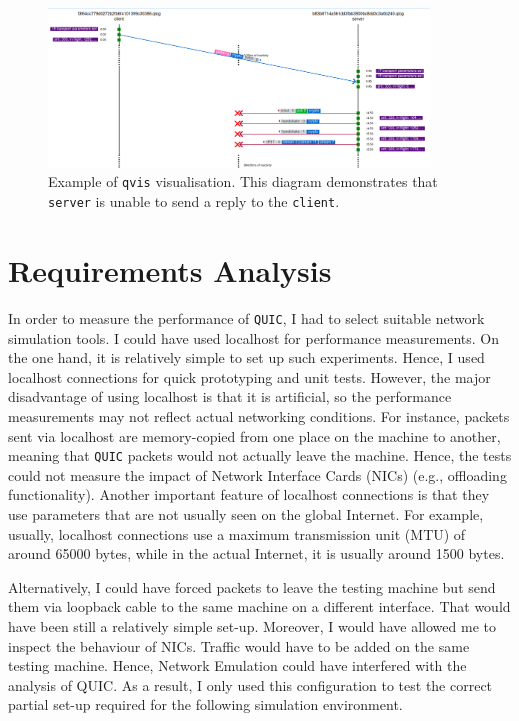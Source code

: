 \documentclass[12pt,a4paper,twoside,openright]{report}
\begin{document}
    \begin{figure}[H]
    \centering
    \includegraphics[width=0.9\textwidth]{figs/qvis.png}
    \caption[Example of \texttt{qvis} visualisation]{Example of \texttt{qvis} visualisation. This diagram demonstrates that \texttt{server} is unable to send a reply to the \texttt{client}.}
    \label{fig:qvis}
    \end{figure}
    



\section{Requirements Analysis}

In order to measure the performance of \texttt{QUIC}, I had to select suitable network simulation tools.
I could have used localhost for performance measurements.
On the one hand, it is relatively simple to set up such experiments.
Hence, I used localhost connections for quick prototyping and unit tests.
However, the major disadvantage of using localhost is that it is artificial, so the performance measurements may not reflect actual networking conditions.
For instance, packets sent via localhost are memory-copied from one place on the machine to another, meaning that \texttt{QUIC} packets would not actually leave the machine.
Hence, the tests could not measure the impact of Network Interface Cards (NICs) (e.g., offloading functionality).
Another important feature of localhost connections is that they use parameters that are not usually seen on the global Internet.
For example, usually, localhost connections use a maximum transmission unit (MTU) of around 65000 bytes, while in the actual Internet, it is usually around 1500 bytes.

 Alternatively, I could have forced packets to leave the testing machine but send them via loopback cable to the same machine on a different interface. 
 That would have been still a relatively simple set-up. 
 Moreover, I would have allowed me to inspect the behaviour of NICs.
 Traffic would have to be added on the same testing machine.
 Hence, Network Emulation could have interfered with the analysis of QUIC.
 As a result, I only used this configuration to test the correct partial set-up required for the following simulation environment.
 
\end{document}
